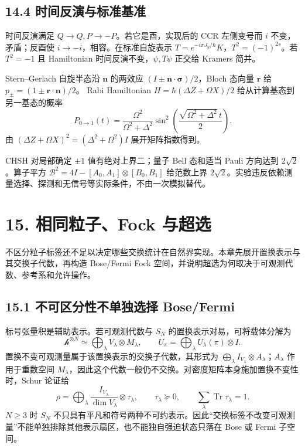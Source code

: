 \documentclass[
  11pt,
  oneside]{book}
\begin{document}
\section{14.4 时间反演与标准基准}

时间反演满足 \(Q\to Q,P\to-P\)。若它是酉，实现后的 CCR 左侧变号而 \(i\)
不变，矛盾；反酉使 \(i\to-i\)，相容。在标准自旋表示
\(T=e^{-i\pi J_y/\hbar}K\)，\(T^2=(-1)^{2s}\)。若 \(T^2=-1\) 且
Hamiltonian 时间反演不变，\(\psi,T\psi\) 正交给 Kramers 简并。

Stern--Gerlach 自旋半态沿 \(\mathbf n\) 的两效应
\((I\pm\mathbf n\cdot\boldsymbol\sigma)/2\)，Bloch 态向量 \(\mathbf r\)
给 \(p_\pm=(1\pm\mathbf r\cdot\mathbf n)/2\)。 Rabi Hamiltonian
\(H=\hbar(\Delta Z+\Omega X)/2\) 给从计算基态到另一基态的概率 \[
P_{0\to1}(t)=\frac{\Omega^2}{\Omega^2+\Delta^2}
\sin^2\left(\frac{\sqrt{\Omega^2+\Delta^2}\,t}{2}\right).
\] 由 \((\Delta Z+\Omega X)^2=(\Delta^2+\Omega^2)I\) 展开矩阵指数得到。

CHSH 对局部确定 \(\pm1\) 值有绝对上界二；量子 Bell 态和适当 Pauli
方向达到 \(2\sqrt2\)。算子平方
\(\mathcal B^2=4I-[A_0,A_1]\otimes[B_0,B_1]\) 给范数上界
\(2\sqrt2\)。实验违反依赖测量选择、探测和无信号等实际条件，不由一次模拟替代。

\chapter{15. 相同粒子、Fock 与超选}\label{ch-15}\hypertarget{ch-15}{}

不区分粒子标签还不足以决定哪些交换统计在自然界实现。本章先展开置换表示与其交换子代数，再构造
Bose/Fermi Fock 空间，并说明超选为何取决于可观测代数、参考系和允许操作。

\section{15.1 不可区分性不单独选择 Bose/Fermi}

标号张量积是辅助表示。若可观测代数与 \(S_N\)
的置换表示对易，可将载体分解为 \[
\mathcal h^{\otimes N}\simeq\bigoplus_\lambda V_\lambda\otimes M_\lambda,
\qquad U_\pi=\bigoplus_\lambda U_\lambda(\pi)\otimes I.
\] 置换不变可观测量属于该置换表示的交换子代数，其形式为
\(\bigoplus_\lambda I_{V_\lambda}\otimes A_\lambda\)；\(A_\lambda\)
作用于重数空间
\(M_\lambda\)，因此这个代数一般仍不交换。对密度矩阵本身施加置换不变性时，Schur
论证给 \[
\rho=\bigoplus_\lambda\frac{I_{V_\lambda}}{\dim V_\lambda}\otimes\tau_\lambda,
\qquad \tau_\lambda\succeq0,\qquad\sum_\lambda\operatorname{Tr}\tau_\lambda=1.
\] \(N\ge3\) 时 \(S_N\)
不只具有平凡和符号两种不可约表示。因此``交换标签不改变可观测量''不能单独排除其他表示扇区，也不能独自强迫状态只落在
Bose 或 Fermi 子空间。
\end{document}
